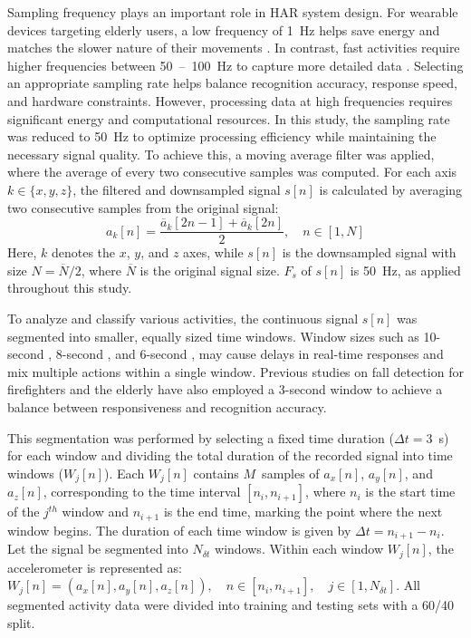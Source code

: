 \documentclass[journal,twoside,web]{ieeecolor}
\begin{document}
Sampling frequency plays an important role in HAR system design. For wearable devices targeting elderly users, a low frequency of 1~Hz helps save energy and matches the slower nature of their movements \cite{Thu2022}. In contrast, fast activities require higher frequencies between 50~--~100~Hz to capture more detailed data \cite{ViManhTuyen2024,HongNhung2023,RealtimeOnESP32_2015,wearableFirefirefighter2015}. Selecting an appropriate sampling rate helps balance recognition accuracy, response speed, and hardware constraints. However, processing data at high frequencies requires significant energy and computational resources. In this study, the sampling rate was reduced to 50~Hz to optimize processing efficiency while maintaining the necessary signal quality. To achieve this, a moving average filter was applied, where the average of every two consecutive samples was computed. For each axis $k \in \{x, y, z\}$, the filtered and downsampled signal $s[n]$ is calculated by averaging two consecutive samples from the original signal:
\begin{equation}
\label{resample}
a_k[n] = \frac{\overline{a}_k[2n - 1] + \overline{a}_k[2n]}{2}, \quad n \in [1, N]
\end{equation}
Here, $k$ denotes the $x$, $y$, and $z$ axes, while $s[n]$ is the downsampled signal with size $N = \overline{N}/2$, where $\overline{N}$ is the original signal size. $F_s$ of $s[n]$ is 50~Hz, as applied throughout this study.

To analyze and classify various activities, the continuous signal $s[n]$ was segmented into smaller, equally sized time windows. Window sizes such as 10-second \cite{HongNhung2023}, 8-second \cite{ViManhTuyen2024}, and 6-second \cite{Thu2022}, may cause delays in real-time responses and mix multiple actions within a single window. Previous studies on fall detection for firefighters \cite{Thanhfire2019, Dang2022} and the elderly \cite{HAR_CNN_2025, HAR_DCT_deeplearning2023,DL_Abdi2024} have also employed a 3-second window to achieve a balance between responsiveness and recognition accuracy.

This segmentation was performed by selecting a fixed time duration ($\Delta t=3$~s) for each window and dividing the total duration of the recorded signal into time windows ($W_j[n]$). Each $W_j[n]$ contains $M$~samples of $a_x[n]$, $a_y[n]$, and $a_z[n]$, corresponding to the time interval $[n_i, n_{i+1}]$, where $n_i$ is the start time of the $j^{th}$ window and $n_{i+1}$ is the end time, marking the point where the next window begins. The duration of each time window is given by $\Delta t = n_{i+1} - n_i$. Let the signal be segmented into $N_{\delta t}$ windows. Within each window $W_j[n]$, the accelerometer is represented as: $W_j[n] = (a_x[n], a_y[n], a_z[n]), \quad n \in [n_i,n_{i+1}], \quad j \in [1,N_{\delta t}]$. All segmented activity data were divided into training and testing sets with a 60/40 split.
\end{document}
